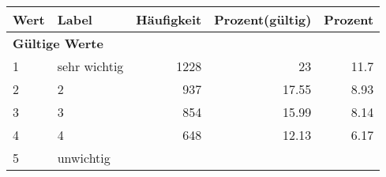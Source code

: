      \begin{longtable}{lXrrr}
     \toprule
     \textbf{Wert} & \textbf{Label} & \textbf{Häufigkeit} & \textbf{Prozent(gültig)} & \textbf{Prozent} \\
     \endhead
     \midrule
     \multicolumn{5}{l}{\textbf{Gültige Werte}}\\

     1 &
     \multicolumn{1}{X}{ sehr wichtig   } &


       \num{1228} &
       \num[round-mode=places,round-precision=2]{23} &
         \num[round-mode=places,round-precision=2]{11.7} \\

     2 &
     \multicolumn{1}{X}{ 2   } &


       \num{937} &
       \num[round-mode=places,round-precision=2]{17.55} &
         \num[round-mode=places,round-precision=2]{8.93} \\

     3 &
     \multicolumn{1}{X}{ 3   } &


       \num{854} &
       \num[round-mode=places,round-precision=2]{15.99} &
         \num[round-mode=places,round-precision=2]{8.14} \\

     4 &
     \multicolumn{1}{X}{ 4   } &


       \num{648} &
       \num[round-mode=places,round-precision=2]{12.13} &
         \num[round-mode=places,round-precision=2]{6.17} \\

     5 &
     \multicolumn{1}{X}{ unwichtig   } &



\end{longtable}
